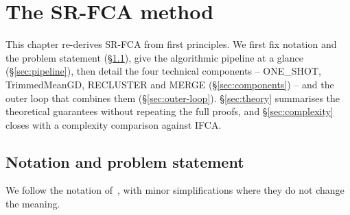 \chapter{The SR-FCA method}\label{ch:method}

This chapter re-derives SR-FCA from first principles. We first fix notation and the problem statement (\S\ref{sec:notation}), give the algorithmic pipeline at a glance (\S\ref{sec:pipeline}), then detail the four technical components -- ONE\_SHOT, TrimmedMeanGD, RECLUSTER and MERGE (\S\ref{sec:components}) -- and the outer loop that combines them (\S\ref{sec:outer-loop}). \S\ref{sec:theory} summarises the theoretical guarantees without repeating the full proofs, and \S\ref{sec:complexity} closes with a complexity comparison against IFCA.

\section{Notation and problem statement}\label{sec:notation}

We follow the notation of~\parencite{vardhan2024srfca}, with minor simplifications where they do not change the meaning.

